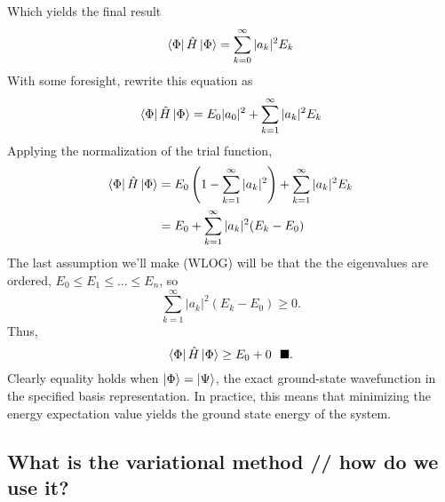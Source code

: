 \documentclass{article}[11pt]
\newcommand{\F}{\Phi}        %
\newcommand{\Y}{\ensuremath{\Psi}}
\begin{document}
Which yields the final result
\begin{equation}
   \bra{\F} 
      \hat{H}
   \ket{\F}
=  
    \sum
    \limits_{k=0}^{\infty}
    | a_k |^2
    E_k
\end{equation}
With some foresight, rewrite this equation as 
\begin{equation}
   \bra{\F} 
      \hat{H}
   \ket{\F}
=  
    E_0 |a_0|^2 
+ 
    \sum
    \limits_{k=1}^{\infty}
    | a_k |^2
    E_k
\end{equation}
Applying the normalization of the trial function, 
\begin{align*}
   \bra{\F} 
      \hat{H}
   \ket{\F}
&=  
    E_0
    \left(
       1 
    - 
        \sum
        \limits_{k=1}^{\infty}
        | a_k |^2
    \right)  
+ 
    \sum
    \limits_{k=1}^{\infty}
    | a_k |^2
    E_k
\\&=
    E_0
+ 
    \sum
    \limits_{k=1}^{\infty}
    | a_k |^2
    ( E_k - E_0 )  
\end{align*}
The last assumption we'll make (WLOG) will be that the the eigenvalues are ordered, $E_0 \leq E_1 \leq ... \leq E_n$, so
\begin{equation}
    \sum
    \limits_{k=1}^{\infty}
    | a_k |^2
    ( E_k - E_0 )
\geq
    0.   
\end{equation}
Thus,
\begin{equation} 
\bra{\F} 
      \hat{H}
   \ket{\F}
\geq
   E_0
+ 
   0  \ \ \blacksquare.
\end{equation}
Clearly equality holds when $\ket{\F} = \ket{\Y}$, the exact ground-state wavefunction in the specified basis representation. In practice, this means that minimizing the energy expectation value yields the ground state energy of the system. 

\newpage
\subsection*{What is the variational method // how do we use it?}
\end{document}

